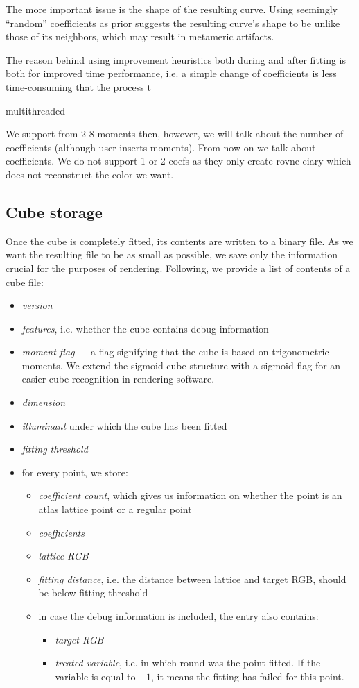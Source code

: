 The more important issue is the shape of the resulting curve. Using seemingly ``random'' coefficients as prior suggests the resulting curve's shape to be unlike those of its neighbors, which may result in metameric artifacts.

The reason behind using improvement heuristics both during and after fitting is both for improved time performance, i.e. a simple change of coefficients is less time-consuming that the process t

multithreaded 

We support from 2-8 moments then, however, we will talk about the number of coefficients (although user inserts moments). From now on we talk about coefficients. We do not support 1 or 2 coefs as they only create rovne ciary which does not reconstruct the color we want.

\subsection{Cube storage}
	
Once the cube is completely fitted, its contents are written to a binary file. As we want the resulting file to be as small as possible, we save only the information crucial for the purposes of rendering. Following, we provide a list of contents of a cube file:
\begin{itemize}
	\item \emph{version}
	\item \emph{features}, i.e. whether the cube contains debug information
	\item \emph{moment flag} --- a flag signifying that the cube is based on trigonometric moments. We extend the sigmoid cube structure with a sigmoid flag for an easier cube recognition in rendering software.
	\item \emph{dimension}
	\item \emph{illuminant} under which the cube has been fitted
	\item \emph{fitting threshold}
	\item for every point, we store:
	\begin{itemize}
		\item \emph{coefficient count}, which gives us information on whether the point is an atlas lattice point or a regular point
		\item \emph{coefficients}
		\item \emph{lattice RGB}
		\item \emph{fitting distance}, i.e. the distance between lattice and target RGB, should be below fitting threshold
		\item in case the debug information is included, the entry also contains:
		\begin{itemize}
			\item \emph{target RGB}
			\item \emph{treated variable}, i.e. in which round was the point fitted. If the variable is equal to $-1$, it means the fitting has failed for this point.
		\end{itemize}
	\end{itemize}
\end{itemize}

